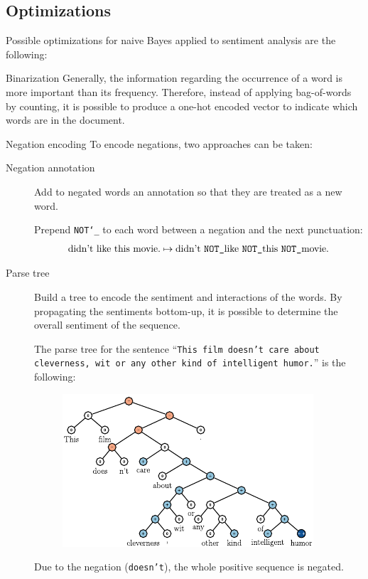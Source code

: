 \subsection{Optimizations}

Possible optimizations for naive Bayes applied to sentiment analysis are the following:
\begin{descriptionlist}
    \item[Binarization] 
        Generally, the information regarding the occurrence of a word is more important than its frequency. Therefore, instead of applying bag-of-words by counting, it is possible to produce a one-hot encoded vector to indicate which words are in the document.

    \item[Negation encoding] 
        To encode negations, two approaches can be taken:
        \begin{description}
            \item[Negation annotation]
                Add to negated words an annotation so that they are treated as a new word.
                \begin{example}
                    Prepend \texttt{NOT\char`_} to each word between a negation and the next punctuation:
                    \[ \text{didn't like this movie.} \mapsto \text{didn't \texttt{NOT\char`_}like \texttt{NOT\char`_}this \texttt{NOT\char`_}movie.} \]
                \end{example}

            \item[Parse tree]
                Build a tree to encode the sentiment and interactions of the words. By propagating the sentiments bottom-up, it is possible to determine the overall sentiment of the sequence.

                \begin{example}
                    The parse tree for the sentence ``\texttt{This film doesn't care about cleverness, wit or any other kind of intelligent humor.}'' is the following:
                    \begin{figure}[H]
                        \centering
                        \includegraphics[width=0.6\linewidth]{./img/_sentiment_parse_tree.pdf}
                    \end{figure}
                    Due to the negation (\texttt{doesn't}), the whole positive sequence is negated.
                \end{example}
        \end{description}


\end{descriptionlist}
